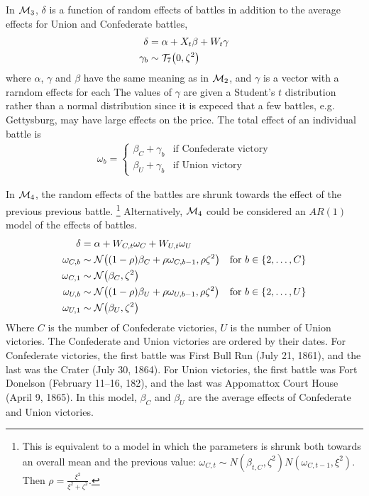 In $\mathcal{M}_{\text{3}}$, $\delta$ is a function of random effects of battles in addition to the average effects for Union and Confederate battles,
\begin{align}
  \label{bonds:eq:10}
  \delta &= \alpha + X_{t} \beta + W_{t} \gamma \\
  \label{bonds:eq:12}
  \gamma_{b} &\sim \mathcal{T}_{7}\mathopen{}\left(0, \zeta^{2}\right)\mathclose{}
\end{align}
where $\alpha$, $\gamma$ and $\beta$ have the same meaning as in $\mathcal{M}_{\text{2}}$, and $\gamma$ is a vector with a rarndom effects for each
The values of $\gamma$ are given a Student's $t$ distribution rather than a normal distribution since it is expeced that a few battles, e.g. Gettysburg, may have large effects on the price.
The total effect of an individual battle is
\begin{align}
  \omega_{b} =
  \begin{cases}
    \beta_{C} + \gamma_{b} & \text{if Confederate victory} \\
    \beta_{U} + \gamma_{b} & \text{if Union victory}
  \end{cases}
\end{align}

In $\mathcal{M}_{\text{4}}$, the random effects of the battles are shrunk towards the effect of the previous previous battle.%
\footnote{
  This is equivalent to a model in which the parameters is shrunk both towards an overall mean and the previous value: $\omega_{C,t} \sim N(\beta_{t,C}, \zeta^{2}) N(\omega_{C,t-1}, \xi^{2})$.
  Then  $\rho = \frac{\xi^{2}}{\xi^{2} + \zeta^{2}}$.
}
Alternatively, $\mathcal{M}_{\text{4}}$ could be considered an $AR(1)$ model of the effects of battles.
\begin{align}
  \label{bonds:eq:11}
  \delta &= \alpha + W_{C,t} \omega_{C} + W_{U,t} \omega_{U} \\
  \omega_{C,b} & \sim \mathcal{N}\mathopen{}\left((1 - \rho) \beta_{C} + \rho \omega_{C,b-1}, \rho \zeta^{2}\right)\mathclose{} & \text{for $b \in \{2, \dots, C\}$} \\
  \omega_{C,1} & \sim \mathcal{N}\mathopen{}\left( \beta_{C}, \zeta^{2}\right)\mathclose{} \\
  \omega_{U,b} & \sim \mathcal{N}\mathopen{}\left((1 - \rho) \beta_{U} + \rho \omega_{U,b-1}, \rho \zeta^{2}\right)\mathclose{} & \text{for $b \in \{2, \dots, U \}$} \\
  \omega_{U,1} & \sim \mathcal{N}\mathopen{}\left( \beta_{U}, \zeta^{2}\right)\mathclose{}
\end{align}
Where $C$ is the number of Confederate victories, $U$ is the number of Union victories.
The Confederate and Union victories are ordered by their dates.
For Confederate victories, the first battle was First Bull Run (July 21, 1861), and the last was the Crater (July 30, 1864).
For Union victories, the first battle was Fort Donelson (February 11--16, 182), and the last was Appomattox Court House (April 9, 1865).
In this model, $\beta_{C}$ and $\beta_{U}$ are the average effects of Confederate and Union victories.

